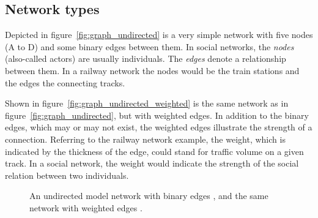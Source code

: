 \subsection{Network types}
\label{subsec:net_types}
Depicted in figure~\ref{fig:graph_undirected} is a very simple network with five nodes (A to D) and some binary edges between them. In social networks, the \textit{nodes} (also-called actors) are usually individuals. The \textit{edges} denote a relationship between them. In a railway network the nodes would be the train stations and the edges the connecting tracks.

Shown in figure~\ref{fig:graph_undirected_weighted} is the same network as in figure~\ref{fig:graph_undirected}, but with weighted edges. In addition to the binary edges, which may or may not exist, the weighted edges illustrate the strength of a connection. Referring to the railway network example, the weight, which is indicated by the thickness of the edge, could stand for traffic volume on a given track. In a social network, the weight would indicate the strength of the social relation between two individuals.  


\begin{figure}[htpb]%
	\centering 
	\qquad 
	\caption[Undirected model network with binary and weighted edges]{An undirected model network with binary edges , and the same network with weighted edges .} 

\end{figure}	 

